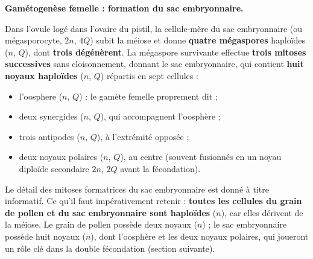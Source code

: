 \documentclass[11pt]{article}
\newcommand{\cle}[1]{{\popxbold\color{popdark}#1}}
\begin{document}
\textbf{Gamétogenèse femelle : formation du sac embryonnaire.}\par
Dans l'\cle{ovule} logé dans l'ovaire du pistil, la \cle{cellule-mère du sac embryonnaire} (ou mégasporocyte, $2n$, $4Q$) subit la méiose et donne \textbf{quatre mégaspores} haploïdes ($n$, $Q$), dont \textbf{trois dégénèrent}. La mégaspore survivante effectue \textbf{trois mitoses successives} sans cloisonnement, donnant le \cle{sac embryonnaire}, qui contient \textbf{huit noyaux haploïdes} ($n$, $Q$) répartis en sept cellules :
\begin{itemize}
\item l'\cle{oosphere} ($n$, $Q$) : le gamète femelle proprement dit ;
\item deux \cle{synergides} ($n$, $Q$), qui accompagnent l'oosphère ;
\item trois \cle{antipodes} ($n$, $Q$), à l'extrémité opposée ;
\item deux \cle{noyaux polaires} ($n$, $Q$), au centre (souvent fusionnés en un noyau diploïde secondaire $2n$, $2Q$ avant la fécondation).
\end{itemize}

\begin{aretenir}
Le détail des mitoses formatrices du sac embryonnaire est donné à titre informatif. Ce qu'il faut impérativement retenir : \textbf{toutes les cellules du grain de pollen et du sac embryonnaire sont haploïdes} ($n$), car elles dérivent de la méiose. Le grain de pollen possède deux noyaux ($n$) ; le sac embryonnaire possède huit noyaux ($n$), dont l'oosphère et les deux noyaux polaires, qui joueront un rôle clé dans la double fécondation (section suivante).
\end{aretenir}
\end{document}
